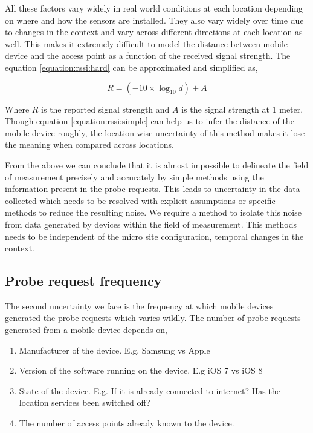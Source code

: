 All these factors vary widely in real world conditions at each location depending on where and how the sensors are installed.
They also vary widely over time due to changes in the context and vary across different directions at each location as well.
This makes it extremely difficult to model the distance between mobile device and the access point as a function of the received signal strength.
The equation \ref{equation:rssi:hard} can be approximated and simplified as,

\begin{equation}
  R = (-10 \times \log_{10}{d}) + A
  \label{equation:rssi:simple}
\end{equation}

Where \(R\) is the reported signal strength and \(A\) is the signal strength at 1 meter.
Though equation \ref{equation:rssi:simple} can help us to infer the distance of the mobile device roughly, the location wise uncertainty of this method makes it lose the meaning when compared across locations.

From the above we can conclude that it is almost impossible to delineate the field of measurement precisely and accurately by simple methods using the information present in the probe requests.
This leads to uncertainty in the data collected which needs to be resolved with explicit assumptions or specific methods to reduce the resulting noise.
We require a method to isolate this noise from data generated by devices within the field of measurement.
This methods needs to be independent of the micro site configuration, temporal changes in the context.

\subsection{Probe request frequency}
The second uncertainty we face is the frequency at which mobile devices generated the probe requests which varies wildly.
The number of probe requests generated from a mobile device depends on,

\begin{enumerate}
  \setlength{\itemindent}{2em}
  \itemsep-0.5em
  \item Manufacturer of the device. E.g. Samsung vs Apple
  \item Version of the software running on the device. E.g iOS 7 vs iOS 8
  \item State of the device. E.g. If it is already connected to internet? Has the location services been switched off?
  \item The number of access points already known to the device.
\end{enumerate}

